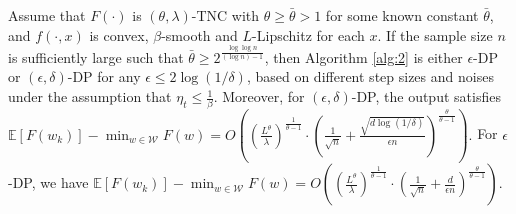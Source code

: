 \documentclass[12pt]{alt2022} %
\begin{document}
	\begin{theorem}\label{thm:1}
	Assume that $F(\cdot)$ is $(\theta, \lambda)$-TNC with $\theta\geq \bar{\theta}>1$ for some known constant $\bar{\theta}$, and $f(\cdot, x)$ is  convex, $\beta$-smooth and $L$-Lipschitz for each $x$. If the sample size $n$ is sufficiently large such that $\bar{\theta}\geq 2^{\frac{\log\log n}{(\log n)-1}}$, then Algorithm \ref{alg:2} is either $\epsilon$-DP or $(\epsilon, \delta)$-DP for any $\epsilon\leq 2\log(1/\delta)$, based on different step sizes and noises under the assumption that $\eta_t\leq \frac{1}{\beta}$. Moreover, for $(\epsilon, \delta)$-DP, the output satisfies
$\mathbb{E} [F(w_k)]-\min_{w\in \mathcal{W}} F(w)= O\left(\left(\frac{L^{\theta}}{\lambda}\right)^{\frac{1}{\theta -1}}\cdot\left(\frac{1}{\sqrt{n}}+\frac{\sqrt{d\log(1/\delta)}}{\epsilon n}\right)^{\frac{\theta}{\theta-1}}\right). $
		For $\epsilon$-DP, we have $\mathbb{E} [F(w_k)]-\min_{w\in \mathcal{W}} F(w)= O\left(\left(\frac{L^{\theta}}{\lambda}\right)^{\frac{1}{\theta -1}}\cdot\left(\frac{1}{\sqrt{n}}+\frac{d}{\epsilon n}\right)^{\frac{\theta}{\theta-1}}\right). $
	\end{theorem}
\end{document}
